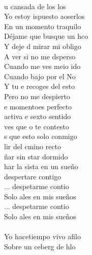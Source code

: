 \begin{cancion}[Despertar][Estopa]%
	            \\
	   u cansada de los los\\
	 Yo estoy ispuesto aoserlos\\
	    En un momento traquilo\\
	Déjame que busque un hco\\
	Y deje d mirar mi obligo\\
	   A ver si no me dsperso\\
	    Cuando me ves meio ido\\
	Cuando bajo por el No\\
	Y tu e recoges del esto\\
	    Pero no me despierto\\
	\jump
	e momentoes perfecto\\
	 activa e sexto sentido\\
	 ves que o te contesto\\
	s que esto solo conmigo\\
	lir del cmino recto\\
	ñar sin star dormido\\
	har la sista en un sueño\\
	 despertare contigo\\
	\jump
	... despetarme contio\\
	Solo ales en mis sueños\\
	... despetarme contio\\
	Solo ales en mis sueños\\
	\jump
	       \\
	\jump
	\jump
	  Yo hacetiempo vivo afilo\\
	  Sobre un ceberg de hlo\\

\end{cancion}
